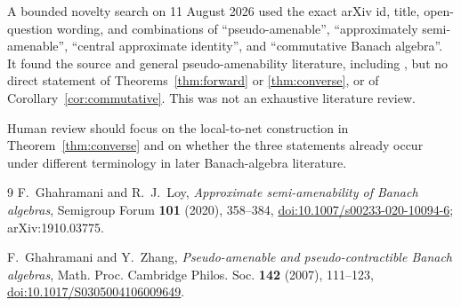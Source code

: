 \documentclass[11pt]{article}
\begin{document}
A bounded novelty search on 11 August 2026 used the exact arXiv id, title,
open-question wording, and combinations of ``pseudo-amenable'',
``approximately semi-amenable'', ``central approximate identity'', and
``commutative Banach algebra''.  It found the source and general
pseudo-amenability literature, including \cite{GZ}, but no direct statement
of Theorems~\ref{thm:forward} or \ref{thm:converse}, or of
Corollary~\ref{cor:commutative}.  This was not an exhaustive literature
review.

Human review should focus on the local-to-net construction in
Theorem~\ref{thm:converse} and on whether the three statements already occur
under different terminology in later Banach-algebra literature.

\begin{thebibliography}{9}
F.~Ghahramani and R.~J.~Loy,
\emph{Approximate semi-amenability of Banach algebras},
Semigroup Forum \textbf{101} (2020), 358--384,
\href{https://doi.org/10.1007/s00233-020-10094-6}{doi:10.1007/s00233-020-10094-6};
arXiv:1910.03775.

F.~Ghahramani and Y.~Zhang,
\emph{Pseudo-amenable and pseudo-contractible Banach algebras},
Math. Proc. Cambridge Philos. Soc. \textbf{142} (2007), 111--123,
\href{https://doi.org/10.1017/S0305004106009649}{doi:10.1017/S0305004106009649}.
\end{thebibliography}
\endgroup
\end{document}
